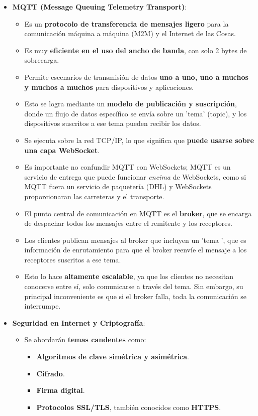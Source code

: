 \documentclass{report}
\begin{document}
\begin{itemize}
    \item \textbf{MQTT (Message Queuing Telemetry Transport)}:
    \begin{itemize}
        \item Es un \textbf{protocolo de transferencia de mensajes ligero} para la comunicación máquina a máquina (M2M) y el Internet de las Cosas.
        \item Es muy \textbf{eficiente en el uso del ancho de banda}, con solo 2 bytes de sobrecarga.
        \item Permite escenarios de transmisión de datos \textbf{uno a uno, uno a muchos y muchos a muchos} para dispositivos y aplicaciones.
        \item Esto se logra mediante un \textbf{modelo de publicación y suscripción}, donde un flujo de datos específico se envía sobre un 'tema' 
        (topic), y los dispositivos suscritos a ese tema pueden recibir los datos.
        \item Se ejecuta sobre la red TCP/IP, lo que significa que \textbf{puede usarse sobre una capa WebSocket}.
        \item Es importante no confundir MQTT con WebSockets; MQTT es un servicio de entrega que puede funcionar \textit{encima} de WebSockets, como 
        si MQTT fuera un servicio de paquetería (DHL) y WebSockets proporcionaran las carreteras y el transporte.
        \item El punto central de comunicación en MQTT es el \textbf{broker}, que se encarga de despachar todos los mensajes entre el remitente y los 
        receptores.
        \item Los clientes publican mensajes al broker que incluyen un  'tema ', que es información de enrutamiento para que el broker reenvíe el 
        mensaje a los receptores suscritos a ese tema.
        \item Esto lo hace \textbf{altamente escalable}, ya que los clientes no necesitan conocerse entre sí, solo comunicarse a través del tema. 
        Sin embargo, su principal inconveniente es que si el broker falla, toda la comunicación se interrumpe.
    \end{itemize}

    \item \textbf{Seguridad en Internet y Criptografía}:
    \begin{itemize}
        \item Se abordarán \textbf{temas candentes} como:
        \begin{itemize}
            \item \textbf{Algoritmos de clave simétrica y asimétrica}.
            \item \textbf{Cifrado}.
            \item \textbf{Firma digital}.
            \item \textbf{Protocolos SSL/TLS}, también conocidos como \textbf{HTTPS}.
        \end{itemize}
    \end{itemize}
\end{itemize}
\end{document}
